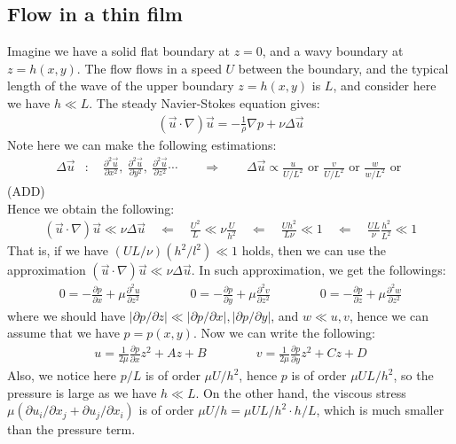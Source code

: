 \documentclass[11pt]{book}
\theoremstyle{break}
\theoremstyle{break}
\newcommand{\pd}{\partial}
\begin{document}
\subsection{Flow in a thin film}
Imagine we have a solid flat boundary at $z=0$, and a wavy boundary at $z=h(x,y)$. The flow flows in a speed $U$ between the boundary, and the typical length of the wave of the upper boundary $z = h(x,y)$ is $L$, and consider here we have $h\ll L$. The steady Navier-Stokes equation gives:
\begin{align*}
(\vec{u}\cdot \nabla ) \vec{u} = -\frac{1}{\rho} \nabla p + \nu \Delta \vec{u}
\end{align*}
Note here we can make the following estimations:
\begin{align*}
\Delta \vec{u}&:\quad \frac{\pd^2 \vec{u}}{\pd x^2}, \ \frac{\pd^2 \vec{u}}{\pd y^2},\ \frac{\pd^2 \vec{u}}{\pd z^2} \cdots \qquad \Rightarrow \qquad \Delta \vec{u}\propto \frac{u}{U/L^2}\text{ or }\frac{v}{U/L^2}\text{ or }\frac{w}{w/L^2} \text{ or }
\end{align*}
(ADD)\\

Hence we obtain the following:
\begin{align*}
(\vec{u}\cdot \nabla) \vec{u}\ll \nu \Delta \vec{u}\quad \Leftarrow\quad \frac{U^2}{L} \ll \nu \frac{U}{h^2}\quad \Leftarrow \quad\frac{Uh^2}{L\nu }\ll 1\quad \Leftarrow\quad \frac{UL}{\nu}\frac{h^2}{L^2}\ll 1 
\end{align*}
That is, if we have $(UL/\nu)(h^2 / l^2) \ll 1$ holds, then we can use the approximation $(\vec{u}\cdot \nabla) \vec{u}\ll \nu \Delta \vec{u}$. In such approximation, we get the followings:
\begin{align*}
0 = -\frac{\pd p}{\pd x} + \mu \frac{\pd^2 u}{\pd z^2}\qquad\qquad
0 = -\frac{\pd p}{\pd y} + \mu \frac{\pd^2 v}{\pd z^2}\qquad\qquad
0 = -\frac{\pd p}{\pd z} + \mu \frac{\pd^2 w}{\pd z^2}
\end{align*}
where we should have $|\pd p/\pd z| \ll |\pd p /\pd x|, |\pd p/\pd y|$, and $w \ll u,v$, hence we can assume that we have $p = p(x,y)$. Now we can write the following:
\begin{align*}
u = \frac{1}{2\mu}\frac{\pd p}{\pd x}z^2 + Az+ B \qquad\qquad v = \frac{1}{2\mu}\frac{\pd p}{\pd y}z^2 + Cz+ D
\end{align*}
Also, we notice here $p/L $ is of order $\mu U / h^2$, hence $p$ is of order $\mu UL/h^2$, so the pressure is large as we have $h \ll L$. On the other hand, the viscous stress $\mu(\pd u_i / \pd x_j + \pd u_j/\pd x_i)$ is of order $\mu U/h = \mu U L/h^2 \cdot h/L$, which is much smaller than the pressure term. 
\end{document}
